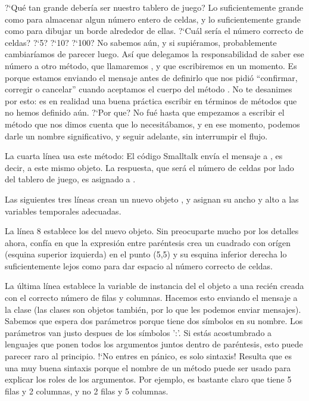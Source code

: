 \documentclass[a4paper,10pt,twoside]{book}
\begin{document}
?`Qu\'e tan grande deber\'ia ser nuestro tablero de juego? Lo suficientemente grande como para almacenar algun n\'umero entero de celdas, y lo suficientemente grande como para dibujar un borde alrededor de ellas.
?`Cu\'al ser\'ia el n\'umero correcto de celdas? ?`5? ?`10? ?`100? No sabemos a\'un, y si supi\'eramos, probablemente cambiar\'iamos de parecer luego. As\'i que delegamos la responsabilidad de saber ese n\'umero a otro m\'etodo, que llamaremos , y que escribiremos en un momento.
Es porque estamos enviando el mensaje  antes de definirlo que \pharo nos pidi\'o ``confirmar, corregir o cancelar'' cuando aceptamos el cuerpo del m\'etodo .
No te desanimes por esto: es en realidad una buena pr\'actica escribir en t\'erminos de m\'etodos que no hemos definido a\'un.
?`Por que? No fu\'e hasta que empezamos a escribir el m\'etodo  que nos dimos cuenta que lo necesit\'abamos, y en ese momento, podemos darle un nombre significativo, y seguir adelante, sin interrumpir el flujo.
 
La cuarta l\'inea usa este m\'etodo:
El c\'odigo Smalltalk  env\'ia el mensaje  a , es decir, a este mismo objeto.
La respuesta, que ser\'a el n\'umero de celdas por lado del tablero de juego, es asignado a .

Las siguientes tres l\'ineas crean un nuevo objeto , y asignan su ancho y alto a las variables temporales adecuadas. 

La l\'inea 8 establece los  del nuevo objeto.
Sin preocuparte mucho por los detalles ahora, conf\'ia en que la expresi\'on entre par\'entesis crea un cuadrado con or\'igen (\ie esquina superior izquierda) en el punto (5,5) y su esquina inferior derecha lo suficientemente lejos como para dar espacio al n\'umero correcto de celdas.

La \'ultima l\'inea establece la variable de instancia  del el objeto  a una reci\'en creada  con el correcto n\'umero de filas y columnas. Hacemos esto enviando el mensaje  a la clase  (las clases son objetos tambi\'en, por lo que les podemos enviar mensajes). Sabemos que  espera dos par\'ametros porque tiene dos s\'imbolos \ct{:} en su nombre. Los par\'ametros van justo despues de los s\'imbolos ':'.
Si est\'as acostumbrado a lenguajes que ponen todos los argumentos juntos dentro de par\'entesis, esto puede parecer raro al principio. !`No entres en p\'anico, es solo sintaxis!
Resulta que es una muy buena sintaxis porque el nombre de un m\'etodo puede ser usado para explicar los roles de los argumentos. Por ejemplo, es bastante claro que  tiene 5 filas y 2 columnas, y no 2 filas y 5 columnas. 
\end{document}
